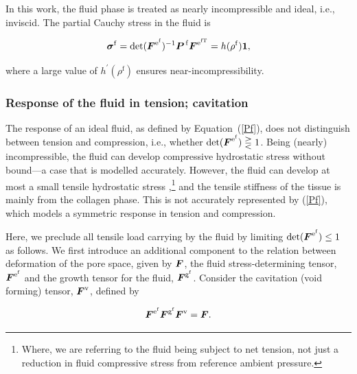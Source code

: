 In this work, the fluid phase is treated as nearly incompressible and
ideal, i.e., inviscid. The partial Cauchy stress in the fluid is

\begin{equation}
\mbox{\boldmath$\sigma$}^\mathrm{f} = \mathrm{det}(\mbox{\boldmath$ F$}^{\mathrm{e}^\mathrm{f}})^{-1}
\mbox{\boldmath$ P$}^{\,\mathrm{f}}\mbox{\boldmath$ F$}^{\mathrm{e}^\mathrm{fT}} =
h(\rho^\mathrm{f}){\bf 1},\label{Pf}
\end{equation}

\noindent where a large value of $h^\prime(\rho^\mathrm{f})$ ensures
near-in\-comp\-ress\-i\-bil\-i\-ty.

\subsubsection{Response of the fluid in tension; cavitation}
\label{caviation-under-tension}

The response of an ideal fluid, as defined by \mbox{Equation
  (\ref{Pf})}, does not distinguish between tension and compression,
i.e., whether $\mathrm{det}(\mbox{\boldmath$ F$}^{\mathrm{e}^\mathrm{f}}) \gtreqless
1$. Being (nearly) incompressible, the fluid can develop compressive
hydrostatic stress without bound---a case that is modelled
accurately. However, the fluid can develop at most a small tensile
hydrostatic stress \citep{cavitationchris},\footnote{Where, we are
  referring to the fluid being subject to net tension, not just a
  reduction in fluid compressive stress from reference ambient
  pressure.} and the tensile stiffness of the tissue is mainly from
the collagen phase. This is not accurately represented by (\ref{Pf}),
which models a symmetric response in tension and compression.

Here, we preclude all tensile load carrying by the fluid by limiting
\mbox{$\mathrm{det}(\mbox{\boldmath$ F$}^{\mathrm{e}^\mathrm{f}}) \leq 1$} as
follows. We first introduce an additional component to the relation
between deformation of the pore space, given by $\mbox{\boldmath$ F$}$, the fluid
stress-determining tensor, $\mbox{\boldmath$ F$}^{\mathrm{e}^\mathrm{f}}$ and the
growth tensor for the fluid, $\mbox{\boldmath$ F$}^{\mathrm{g}^\mathrm{f}}$. Consider
the cavitation (void forming) tensor, $\mbox{\boldmath$ F$}^{\mathrm{v}}$, defined by
  
\begin{equation}
 \mbox{\boldmath$ F$}^{\mathrm{e}^\mathrm{f}}\mbox{\boldmath$ F$}^{\mathrm{g}^\mathrm{f}}
 \mbox{\boldmath$ F$}^{\mathrm{v}} = \mbox{\boldmath$ F$}.
\label{fvoid}
\end{equation}

